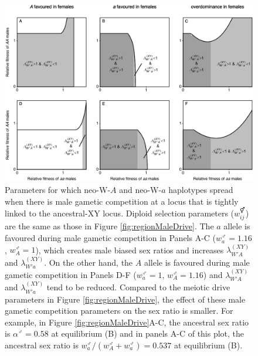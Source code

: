 \documentclass[12pt]{article}
\begin{document}
\newpage
\begin{figure}[!h]
\centering
\centerline{\includegraphics[width=\linewidth]{Region_Plot_combined_MaleGS.eps}}
\caption{
Parameters for which neo-W-$A$ and neo-W-$a$ haplotypes spread when there is male gametic competition at a locus that is tightly linked to the ancestral-XY locus.
Diploid selection parameters ($w_{ij}^\Hermaphrodite$) are the same as those in Figure \ref{fig:regionMaleDrive}. 
The $a$ allele is favoured during male gametic competition in Panels A-C ($w_{a}^\male=1.16$, $w_{A}^\male=1$), which creates male biased sex ratios and increases $\lambda_{W'A}^{(XY)}$ and $\lambda_{W'a}^{(XY)}$. 
On the other hand, the $A$ allele is favoured during male gametic competition in Panels D-F ($w_{a}^\male=1$, $w_{A}^\male=1.16$) and $\lambda_{W'A}^{(XY)}$ and $\lambda_{W'a}^{(XY)}$ tend to be reduced. 
Compared to the meiotic drive parameters in Figure \ref{fig:regionMaleDrive}, the effect of these male gametic competition parameters on the sex ratio is smaller. 
For example, in Figure \ref{fig:regionMaleDrive}A-C, the ancestral sex ratio is $\alpha^\male=0.58$ at equilibrium (B) and in panels A-C of this plot, the ancestral sex ratio is $w_{a}^\male/(w_{A}^\male+w_{a}^\male)=0.537$ at equilibrium (B). 
}
\label{fig:regionMaleGS}
\end{figure}
\end{document}
